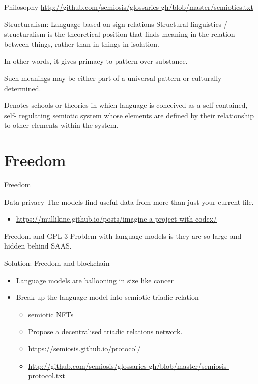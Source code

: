 \documentclass[presentation]{beamer}
\begin{document}
\begin{frame}[label={sec:org81a32be}]{Philosophy}
\url{http://github.com/semiosis/glossaries-gh/blob/master/semiotics.txt}

\begin{block}{Structuralism: Language based on sign relations}
Structural linguistics / structuralism is the
theoretical position that finds meaning in the
relation between things, rather than in things
in isolation.

In other words, it gives primacy to pattern
over substance.

Such meanings may be either part of a
universal pattern or culturally determined.

Denotes schools or theories in which language
is conceived as a self-contained, self-
regulating semiotic system whose elements are
defined by their relationship to other
elements within the system.
\end{block}
\end{frame}

\section{Freedom}
\label{sec:org14ebf36}
\begin{frame}[label={sec:org33366ed}]{Freedom}
\begin{block}{Data privacy}
The models find useful data from more than just your current file.
\begin{itemize}
\item \url{https://mullikine.github.io/posts/imagine-a-project-with-codex/}
\end{itemize}
\end{block}

\begin{block}{Freedom and GPL-3}
Problem with language models is they are so large and hidden behind SAAS.
\end{block}

\begin{block}{Solution: Freedom and blockchain}
\begin{itemize}
\item Language models are ballooning in size like cancer
\item Break up the language model into semiotic triadic relation
\begin{itemize}
\item semiotic NFTs
\item Propose a decentralised triadic relations network.
\item \url{https://semiosis.github.io/protocol/}
\item \url{http://github.com/semiosis/glossaries-gh/blob/master/semiosis-protocol.txt}
\end{itemize}
\end{itemize}
\end{block}
\end{frame}
\end{document}
